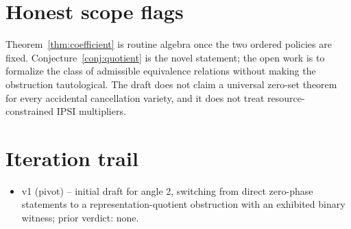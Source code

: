 \documentclass[11pt]{article}
\theoremstyle{definition}
\theoremstyle{plain}
\theoremstyle{remark}
\begin{document}
\section{Honest scope flags}
Theorem~\ref{thm:coefficient} is routine algebra once the two ordered policies are fixed. Conjecture~\ref{conj:quotient} is the novel statement; the open work is to formalize the class of admissible equivalence relations without making the obstruction tautological. The draft does not claim a universal zero-set theorem for every accidental cancellation variety, and it does not treat resource-constrained IPSI multipliers.

\section{Iteration trail}
\begin{itemize}[leftmargin=*]
\item v1 (pivot) -- initial draft for angle 2, switching from direct zero-phase statements to a representation-quotient obstruction with an exhibited binary witness; prior verdict: none.
\end{itemize}
\end{document}
